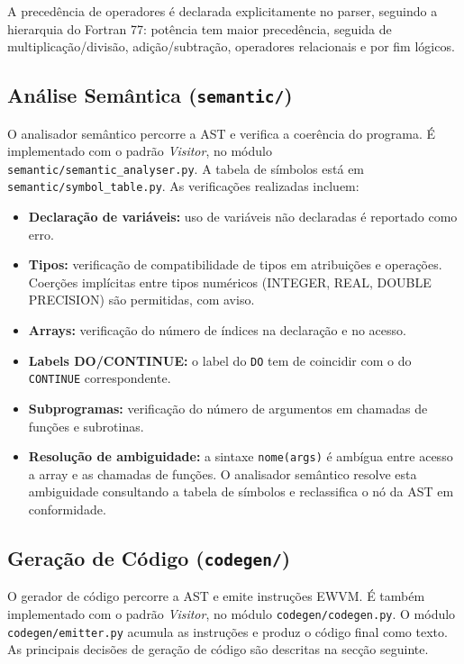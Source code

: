 \documentclass[11pt, a4paper, fleqn]{article}
\begin{document}
\noindent A precedência de operadores é declarada explicitamente no parser, seguindo a hierarquia do Fortran 77: potência tem maior precedência, seguida de multiplicação/divisão, adição/subtração, operadores relacionais e por fim lógicos.

\subsection{Análise Semântica (\texttt{semantic/})}

O analisador semântico percorre a AST e verifica a coerência do programa. É implementado com o padrão \textit{Visitor}, no módulo \texttt{semantic/semantic\_analyser.py}. A tabela de símbolos está em \texttt{semantic/symbol\_table.py}. As verificações realizadas incluem:

\begin{itemize}
    \item \textbf{Declaração de variáveis:} uso de variáveis não declaradas é reportado como erro.
    \item \textbf{Tipos:} verificação de compatibilidade de tipos em atribuições e operações. Coerções implícitas entre tipos numéricos (INTEGER, REAL, DOUBLE PRECISION) são permitidas, com aviso.
    \item \textbf{Arrays:} verificação do número de índices na declaração e no acesso.
    \item \textbf{Labels DO/CONTINUE:} o label do \texttt{DO} tem de coincidir com o do \texttt{CONTINUE} correspondente.
    \item \textbf{Subprogramas:} verificação do número de argumentos em chamadas de funções e subrotinas.
    \item \textbf{Resolução de ambiguidade:} a sintaxe \texttt{nome(args)} é ambígua entre acesso a array e as chamadas de funções. O analisador semântico resolve esta ambiguidade consultando a tabela de símbolos e reclassifica o nó da AST em conformidade.
\end{itemize}

\subsection{Geração de Código (\texttt{codegen/})}

O gerador de código percorre a AST e emite instruções EWVM. É também implementado com o padrão \textit{Visitor}, no módulo \texttt{codegen/codegen.py}. O módulo \texttt{codegen/emitter.py} acumula as instruções e produz o código final como texto. As principais decisões de geração de código são descritas na secção seguinte.
\end{document}
